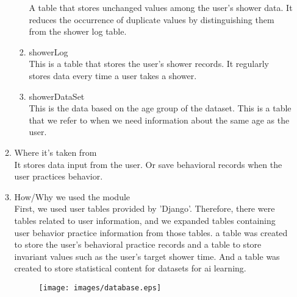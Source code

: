 \documentclass[11pt, conference]{IEEEtran}
\begin{document}
\begin{enumerate}[label=\arabic*]
\begin{enumerate}[label=\alph*]
\begin{enumerate}
            A table that stores unchanged values among the user's shower data. It reduces the occurrence of duplicate values by distinguishing them from the shower log table.
            \item showerLog\\
            This is a table that stores the user's shower records. It regularly stores data every time a user takes a shower.
            \item showerDataSet\\
            This is the data based on the age group of the dataset. This is a table that we refer to when we need information about the same age as the user.
        \end{enumerate}
        \item Where it's taken from\\
        It stores data input from the user. Or save behavioral records when the user practices behavior.
        \item How/Why we used the module\\
        First, we used user tables provided by 'Django'. Therefore, there were tables related to user information, and we expanded tables containing user behavior practice information from those tables. a table was created to store the user's behavioral practice records and a table to store invariant values such as the user's target shower time. And a table was created to store statistical content for datasets for ai learning.
        \begin{figure}[H]
            \centering
            \texttt{[image: images/database.eps]}
        \end{figure}
    \end{enumerate}
    

\end{enumerate}
\end{document}
